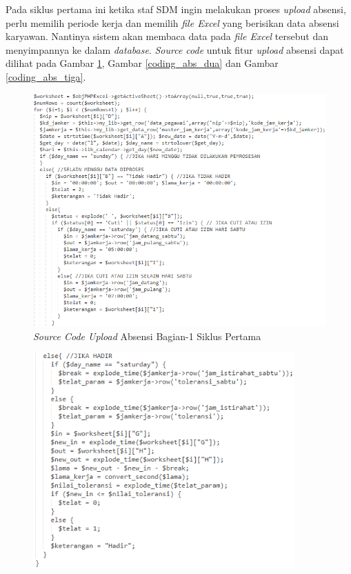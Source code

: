 \begin{enumerate}
	    Pada siklus pertama ini ketika staf SDM ingin melakukan proses \emph{upload} absensi, perlu memilih periode kerja dan memilih \emph{file Excel} yang berisikan data absensi karyawan. Nantinya sistem akan membaca data pada \emph{file Excel} tersebut dan menyimpannya ke dalam \emph{database}. \emph{Source code} untuk fitur \emph{upload} absensi dapat dilihat pada Gambar \ref{coding_abs_satu}, Gambar \ref{coding_abs_dua} dan Gambar \ref{coding_abs_tiga}.
	    \begin{figure}[H]
	    \centering            		    \includegraphics[width=13cm]{gambar/coding/up-absensi1-siklus1}
	    \caption{\emph{Source Code Upload} Absensi Bagian-1 Siklus Pertama}
	    \label{coding_abs_satu}
    	\end{figure}
    	\begin{figure}[H]
    	    \centering            		    \includegraphics[width=10cm]{gambar/coding/up-absensi2-siklus1}

\end{figure}
\end{enumerate}
